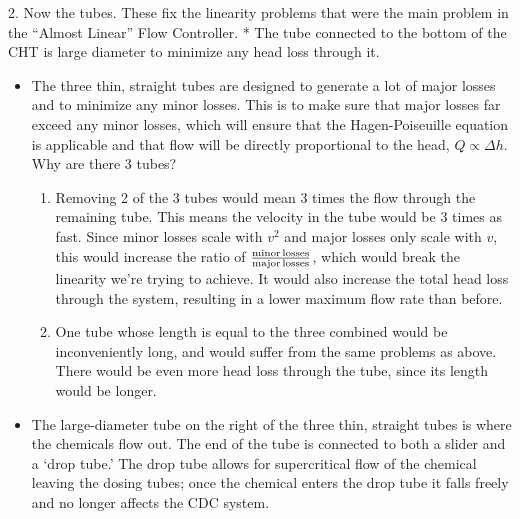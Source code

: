 \documentclass[letterpaper,10pt,english]{sphinxmanual}
\begin{document}
2. Now the tubes. These fix the linearity problems that were the main problem in the “Almost Linear” Flow Controller.
* The tube connected to the bottom of the CHT is large diameter to minimize any head loss through it.
\begin{itemize}
\item {} 
The three thin, straight tubes are designed to generate a lot of major losses and to minimize any minor losses. This is to make sure that major losses far exceed any minor losses, which will ensure that the Hagen-Poiseuille equation is applicable and that flow will be directly proportional to the head, \(Q \propto \Delta h\). Why are there 3 tubes?
\begin{enumerate}
\item {} 
 Removing 2 of the 3 tubes would mean 3 times the flow through the remaining tube. This means the velocity in the tube would be 3 times as fast. Since minor losses scale with \(v^2\) and major losses only scale with \(v\), this would increase the ratio of \(\rm{\frac{minor \, losses}{major \, losses}}\), which would break the linearity we’re trying to achieve. It would also increase the total head loss through the system, resulting in a lower maximum flow rate than before.

\item {} 
 One tube whose length is equal to the three combined would be inconveniently long, and would suffer from the same problems as above. There would be even more head loss through the tube, since its length would be longer.

\end{enumerate}

\item {} 
The large-diameter tube on the right of the three thin, straight tubes is where the chemicals flow out. The end of the tube is connected to both a slider and a ‘drop tube.’ The drop tube allows for supercritical flow of the chemical leaving the dosing tubes; once the chemical enters the drop tube it falls freely and no longer affects the CDC system.

\end{itemize}
\end{document}

